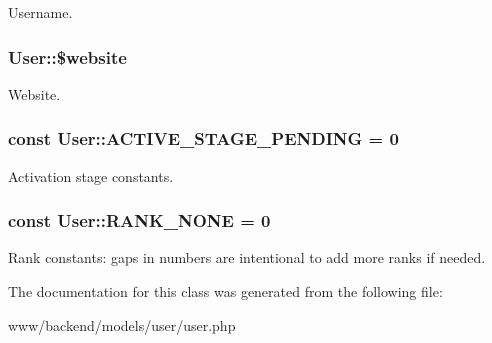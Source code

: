 \label{classUser_ad22e19a56691cba5dc54ac38a91b79ff}
Username. \hypertarget{classUser_a9908094d21697133de85c18d68bb94f3}{
\subsubsection[{\$website}]{\setlength{\rightskip}{0pt plus 5cm}User::\$website}}
\label{classUser_a9908094d21697133de85c18d68bb94f3}
Website. \hypertarget{classUser_ad477706601fcfa5e9c58a52c626eac9c}{
\subsubsection[{ACTIVE\_\-STAGE\_\-PENDING}]{\setlength{\rightskip}{0pt plus 5cm}const {\bf User::ACTIVE\_\-STAGE\_\-PENDING} = 0}}
\label{classUser_ad477706601fcfa5e9c58a52c626eac9c}
Activation stage constants. \hypertarget{classUser_ad4d2977f50b53b871bf059c570faf6d3}{
\subsubsection[{RANK\_\-NONE}]{\setlength{\rightskip}{0pt plus 5cm}const {\bf User::RANK\_\-NONE} = 0}}
\label{classUser_ad4d2977f50b53b871bf059c570faf6d3}
Rank constants: gaps in numbers are intentional to add more ranks if needed. 

The documentation for this class was generated from the following file:\begin{DoxyCompactItemize}
\item 
www/backend/models/user/user.php\end{DoxyCompactItemize}
